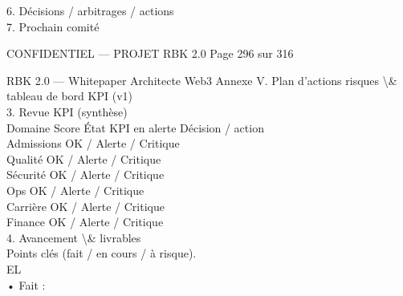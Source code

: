 \documentclass[12pt,landscape,a4paper]{article}
\newenvironment{confidential}
{\begin{tcolorbox}[
    colback=rbkred!5!white,
    colframe=rbkred!75!black,
    title=CONFIDENTIEL,
    fonttitle=\bfseries\color{white},
    coltitle=rbkred!75!black,
    breakable,
    enhanced,
    frame hidden,
    borderline west={2pt}{0pt}{rbkred!75!black}
]}
{\end{tcolorbox}}
\begin{document}
\vspace{0.5em}
6. Décisions / arbitrages / actions\\
\vspace{0.5em}
7. Prochain comité\\
\vspace{0.5em}
\vspace{0.5em}
\vspace{0.5em}
\vspace{0.5em}
\begin{confidential}CONFIDENTIEL — PROJET RBK 2.0                                                                  Page 296 sur 316\end{confidential}
RBK 2.0 — Whitepaper Architecte Web3                                                   Annexe V. Plan d’actions risques \textbackslash{}& tableau de bord KPI (v1)\\
\vspace{0.5em}
\vspace{0.5em}
3. Revue KPI (synthèse)\\
\vspace{0.5em}
Domaine      Score        État                             KPI en alerte              Décision / action\\
Admissions                OK / Alerte / Critique\\
Qualité                   OK / Alerte / Critique\\
Sécurité                  OK / Alerte / Critique\\
Ops                       OK / Alerte / Critique\\
Carrière                  OK / Alerte / Critique\\
Finance                   OK / Alerte / Critique\\
\vspace{0.5em}
\vspace{0.5em}
\vspace{0.5em}
4. Avancement \textbackslash{}& livrables\\
Points clés (fait / en cours / à risque).\\
\vspace{0.5em}
\vspace{0.5em}
\vspace{0.5em}
\vspace{0.5em}
EL\\
• Fait :\\
\vspace{0.5em}
\vspace{0.5em}
\vspace{0.5em}
\end{document}
